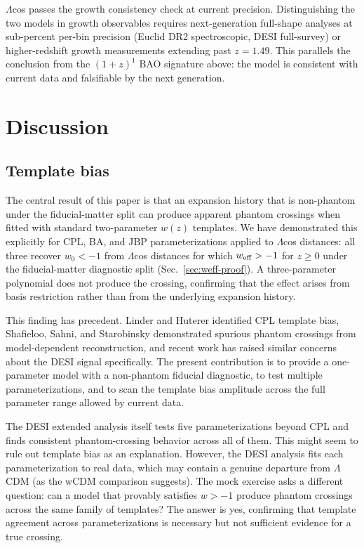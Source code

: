 \documentclass[
  aps,
  prd,
  onecolumn,         %
  nofootinbib,
  longbibliography
]{revtex4-2}
\begin{document}
$\Lambda$cos passes the growth consistency check at current precision.
Distinguishing the two models in growth observables requires
next-generation full-shape analyses at sub-percent per-bin precision
(Euclid DR2 spectroscopic, DESI full-survey) or higher-redshift
growth measurements extending past $z = 1.49$. This parallels the
conclusion from the $(1+z)^1$ BAO signature above: the model is consistent with current data
and falsifiable by the next generation.

\section{Discussion}\label{sec:discussion}

\subsection{Template bias}\label{sec:disc-tb}

The central result of this paper is that an expansion history that is non-phantom under the fiducial-matter split can produce apparent phantom crossings when fitted with standard
two-parameter $w(z)$ templates. We have demonstrated this explicitly for
CPL, BA, and JBP parameterizations applied to $\Lambda$cos distances: all three
recover $w_0 < -1$ from $\Lambda$cos distances for which $w_{\rm eff} > -1$ for $z \geq 0$ under the fiducial-matter diagnostic
split (Sec.~\ref{sec:weff-proof}). A three-parameter polynomial does not produce the crossing,
confirming that the effect arises from basis restriction rather than
from the underlying expansion history.

This finding has precedent. Linder and Huterer \cite{ref12} identified CPL
template bias, Shafieloo, Sahni, and Starobinsky \cite{ref13} demonstrated
spurious phantom crossings from model-dependent reconstruction, and
recent work \cite{ref8,ref14} has raised similar concerns about the DESI signal
specifically. The present contribution is to provide a one-parameter
model with a non-phantom fiducial diagnostic, to test multiple
parameterizations, and to scan the template bias amplitude across the
full parameter range allowed by current data.


The DESI extended analysis \cite{ref9} itself tests five parameterizations
beyond CPL and finds consistent phantom-crossing behavior across all of
them. This might seem to rule out template bias as an explanation.
However, the DESI analysis fits each parameterization to real data,
which may contain a genuine departure from $\Lambda$CDM (as the wCDM comparison
suggests). The mock exercise asks a different question:
can a model that provably satisfies $w > -1$ produce phantom
crossings across the same family of templates? The answer is yes,
confirming that template agreement across parameterizations is necessary
but not sufficient evidence for a true crossing.
\end{document}
